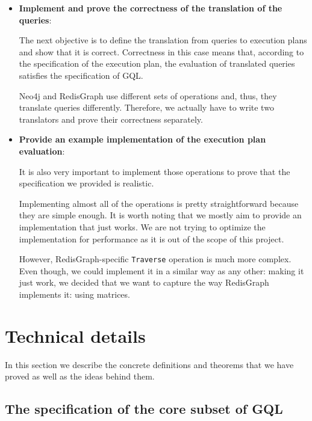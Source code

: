 \documentclass[14pt]{constructor-thesis}
\theoremstyle{definition}
\begin{document}
\begin{itemize}
  \item \textbf{Implement and prove the correctness of the translation of the queries}:
  
  The next objective is to define the translation from queries to execution plans and show that it is correct. Correctness in this case means that, according to the specification of the execution plan, the evaluation of translated queries satisfies the specification of GQL.


  Neo4j and RedisGraph use different sets of operations and, thus, they translate queries differently. Therefore, we actually have to write two translators and prove their correctness separately.

  \item \textbf{Provide an example implementation of the execution plan evaluation}:
  
  It is also very important to implement those operations to prove that the specification we provided is realistic.
  
  Implementing almost all of the operations is pretty straightforward because they are simple enough. It is worth noting that we mostly aim to provide an implementation that just works. We are not trying to optimize the implementation for performance as it is out of the scope of this project.

  However, RedisGraph-specific \texttt{Traverse} operation is much more complex. Even though, we could implement it in a similar way as any other: making it just work, we decided that we want to capture the way RedisGraph implements it: using matrices. 
  

\end{itemize}

\section{Technical details}

In this section we describe the concrete definitions and theorems that we have proved as well as the ideas behind them.

\subsection{The specification of the core subset of GQL}
\end{document}

